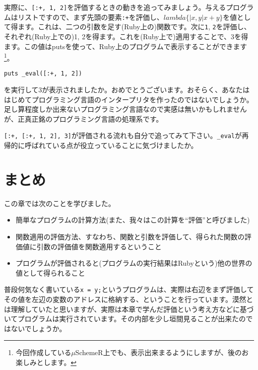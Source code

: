 実際に、{\tt [:+, 1, 2]}を評価するときの動きを追ってみましょう。与えるプログラムはリストですので、まず先頭の要素{\tt :+}を評価し、$lambda\{|x, y| x + y\}$を値として得ます。これは、二つの引数を足す(Ruby上の)関数です。次に{\tt 1}, {\tt 2}を評価し、それぞれ(Ruby上での)1, 2を得ます。これを(Ruby上で)適用することで、3を得ます。この値はputsを使って、Ruby上のプログラムで表示することができます\footnote{今回作成している$\mu$SchemeR上でも、表示出来まるようにしますが、後のお楽しみとします。}。

\begin{lstlisting}
puts _eval([:+, 1, 2])
\end{lstlisting}

を実行して3が表示されましたか。おめでとうございます。おそらく、あなたははじめてプログラミング言語のインタープリタを作ったのではないでしょうか。足し算程度しか出来ないプログラミング言語なので実感は無いかもしれませんが、正真正銘のプログラミング言語の処理系です。

{\tt [:+, [:+, 1, 2], 3]}が評価される流れも自分で追ってみて下さい。{\tt \_eval}が再帰的に呼ばれている点が役立っていることに気づけましたか。

\section{まとめ}

この章では次のことを学びました。

\begin{itemize}
\item 簡単なプログラムの計算方法(また、我々はこの計算を“評価”と呼びました)
\item 関数適用の評価方法、すなわち、関数と引数を評価して、得られた関数の評価値に引数の評価値を関数適用するということ
\item プログラムが評価されると(プログラムの実行結果はRubyという)他の世界の値として得られること
\end{itemize}

普段何気なく書いている{\tt x = y;}というプログラムは、実際は右辺をまず評価してその値を左辺の変数のアドレスに格納する、ということを行っています。漠然とは理解していたと思いますが、実際は本章で学んだ評価という考え方などに基づいてプログラムは実行されています。その内部を少し垣間見ることが出来たのではないでしょうか。
